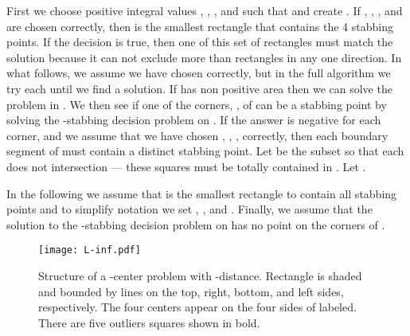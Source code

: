 \documentclass[11pt]{myclass}
\begin{document}
First we choose positive integral values , , , and  such that  and create .  
If , , , and  are chosen correctly, then  is the smallest rectangle that contains the 4 stabbing points.  If the decision is true, then one of this set of  rectangles must match the solution because it can not exclude more than  rectangles in any one direction.
In what follows, we assume we have chosen  correctly, but in the full algorithm we try each until we find a solution.  
If  has non positive area then we can solve the problem in .  We then see if one of the corners, , of  can be a stabbing point by solving the -stabbing decision problem on .  If the answer is negative for each corner, and we assume that we have chosen , , ,  correctly, then each boundary segment of  must contain a distinct stabbing point.  
Let  be the subset so that each  does not intersection  --- these squares must be totally contained in .  Let .  

In the following we assume that  is the smallest rectangle to contain all stabbing points and to simplify notation we set , , and .  Finally, we assume that the solution to the -stabbing decision problem on  has no point on the corners of .  










\begin{figure}[h!!t]
  \centering
  \texttt{[image: L-inf.pdf]}
  \caption{\label{fig:rect4}
                Structure of a -center problem with -distance.  Rectangle  is shaded and bounded by lines  on the top, right, bottom, and left sides, respectively.  The four centers appear on the four sides of  labeled.  There are five outliers squares shown in bold.}
\end{figure}
\end{document}
